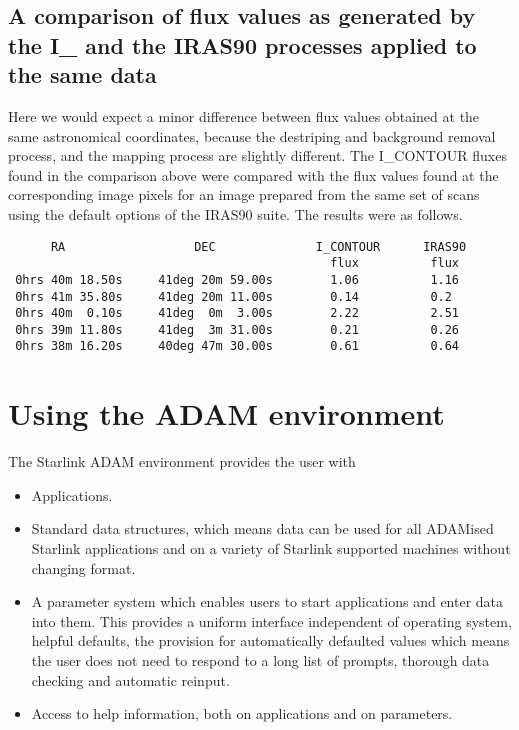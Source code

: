 \documentclass[twoside,11pt]{article}
\newcommand{\xlabel}[1]{}
\begin{document}
\subsection{A comparison of flux values as generated by the I\_ and the IRAS90
processes applied to the same data}
Here we would expect a minor difference between flux values obtained at the
same astronomical coordinates, because the destriping and background removal
process, and the mapping process are slightly different.
The I\_CONTOUR fluxes found in the comparison above were compared with the flux
values found at the corresponding image pixels for an image prepared  from the 
same set of scans using the default options of the IRAS90 suite. The results
were as follows.
\begin{small}
\begin{verbatim}
      RA                  DEC              I_CONTOUR      IRAS90
                                             flux          flux
 0hrs 40m 18.50s     41deg 20m 59.00s        1.06          1.16        
 0hrs 41m 35.80s     41deg 20m 11.00s        0.14          0.2
 0hrs 40m  0.10s     41deg  0m  3.00s        2.22          2.51
 0hrs 39m 11.80s     41deg  3m 31.00s        0.21          0.26
 0hrs 38m 16.20s     40deg 47m 30.00s        0.61          0.64
\end{verbatim}
\end{small}

\section{Using the ADAM environment
\xlabel{using_the_adam_environment}\label{m:useadam}}

The Starlink ADAM environment provides the user with
\begin{itemize}
\item Applications.
\item Standard data structures, which means data can be used for all
ADAMised Starlink applications and on a variety of Starlink supported machines
without changing format.
\item A parameter system which enables users to start applications and enter
data into them. This provides a uniform interface independent of operating
system, helpful defaults, the provision for automatically defaulted values which
means the user does not need to respond to a long list of prompts, thorough data
checking and automatic reinput.
\item Access to help information, both on applications and on parameters.
\end{itemize}
\end{document}
